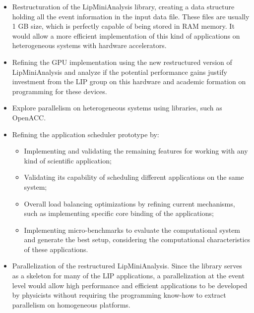 \begin{itemize}
	\item Restructuration of the LipMiniAnalysis library, creating a data structure holding all the event information in the input data file. These files are usually 1 GB size, which is perfectly capable of being stored in RAM memory. It would allow a more efficient implementation of this kind of applications on heterogeneous systems with hardware accelerators.
	\item Refining the GPU implementation using the new restructured version of LipMiniAnalysis and analyze if the potential performance gains justify investment from the LIP group on this hardware and academic formation on programming for these devices.
	\item Explore parallelism on heterogeneous systems using libraries, such as OpenACC.
	\item Refining the application scheduler prototype by:
	\begin{itemize}
		\item Implementing and validating the remaining features for working with any kind of scientific application;
		\item Validating its capability of scheduling different applications on the same system;
		\item Overall load balancing optimizations by refining current mechanisms, such as implementing specific core binding of the applications;
		\item Implementing micro-benchmarks to evaluate the computational system and generate the best setup, considering the computational characteristics of these applications.
	\end{itemize}
	\item Parallelization of the restructured LipMiniAnalysis. Since the library serves as a skeleton for many of the LIP applications, a parallelization at the event level would allow high performance and efficient applications to be developed by physicists without requiring the programming know-how to extract parallelism on homogeneous platforms.
\end{itemize}
